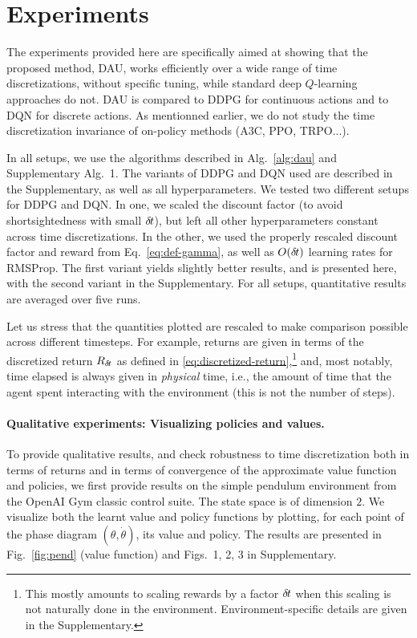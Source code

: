 \section{Experiments}
\label{sec:exp}

The experiments provided here are specifically aimed at showing that
the proposed method, DAU, works efficiently over a wide range of time
discretizations, without specific tuning, while standard deep $Q$-learning
approaches do not. DAU is compared to DDPG for continuous actions and to DQN
for discrete actions.  As mentionned earlier, we do not study the time
discretization invariance of on-policy methods (A3C, PPO, TRPO...).

In all setups, we use the algorithms described in
Alg.~\ref{alg:dau} and Supplementary Alg.~1. The variants of DDPG and DQN
used are described in the Supplementary, as well as all hyperparameters. We tested two different setups for DDPG and DQN.
In one, we scaled the discount factor (to avoid shortsightedness with small ${\delta\hspace{-.1em}t}$), but
left all other hyperparameters constant across time discretizations.
In the other, we used the properly rescaled discount
factor and reward from Eq.~\eqref{eq:def-gamma},
as well as $O({\delta\hspace{-.1em}t})$ learning rates for RMSProp.  The first variant yields slightly
better results, and is presented here, with the second variant in the
Supplementary. For all setups, quantitative results are averaged over five runs.

Let us stress that the quantities plotted are rescaled to make comparison
possible across different timesteps. For example,
returns are given in terms of the discretized return $R_{\delta\hspace{-.1em}t}$ as defined in \eqref{eq:discretized-return},\footnote{This mostly amounts to scaling rewards
by a factor ${\delta\hspace{-.1em}t}$ when this scaling is not naturally done in the environment. Environment-specific
details are given in the Supplementary.} and, most notably, time elapsed is always given in
\emph{physical} time, i.e., the amount of time that the agent spent
interacting with the environment (this is not the number of steps).


\paragraph{Qualitative experiments: Visualizing policies and values.}
To provide qualitative results, and check robustness to time
discretization both in terms of returns and in terms
of convergence of the approximate value function and policies, we first provide results on the simple pendulum environment
from the OpenAI Gym classic control suite.  The state space is of
dimension $2$. We visualize both the learnt value and policy functions by
plotting, for each point of the phase diagram $(\theta, \dot{\theta})$,
its value and policy. The results are presented in
Fig.~\ref{fig:pend} (value function) and Figs.~1, 2,  3 in
Supplementary.

